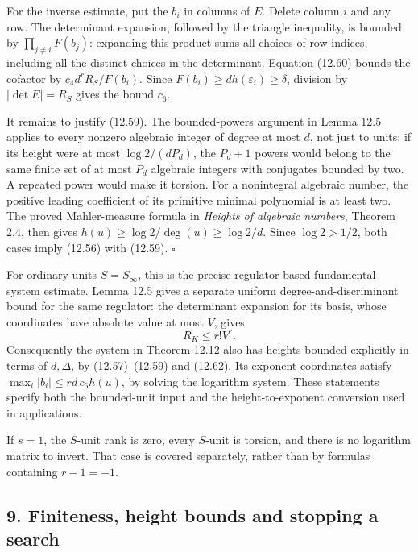 \documentclass[
  11pt,
  a4paper,
]{article}
\begin{document}
For the inverse estimate, put the \(b_i\) in columns of \(E\). Delete
column \(i\) and any row. The determinant expansion, followed by the
triangle inequality, is bounded by \(\prod_{j\ne i}F(b_j)\): expanding
this product sums all choices of row indices, including all the distinct
choices in the determinant. Equation (12.60) bounds the cofactor by
\(c_4d^rR_S/F(b_i)\). Since \(F(b_i)\ge d h(\varepsilon_i)\ge\delta\),
division by \(|\det E|=R_S\) gives the bound \(c_6\).

It remains to justify (12.59). The bounded-powers argument in Lemma 12.5
applies to every nonzero algebraic integer of degree at most \(d\), not
just to units: if its height were at most \(\log2/(dP_d)\), the
\(P_d+1\) powers would belong to the same finite set of at most \(P_d\)
algebraic integers with conjugates bounded by two. A repeated power
would make it torsion. For a nonintegral algebraic number, the positive
leading coefficient of its primitive minimal polynomial is at least two.
The proved Mahler-measure formula in \emph{Heights of algebraic
numbers}, Theorem 2.4, then gives \(h(u)\ge\log2/\deg(u)\ge\log2/d\).
Since \(\log2>1/2\), both cases imply (12.56) with (12.59). \(\square\)

For ordinary units \(S=S_\infty\), this is the precise regulator-based
fundamental-system estimate. Lemma 12.5 gives a separate uniform
degree-and-discriminant bound for the same regulator: the determinant
expansion for its basis, whose coordinates have absolute value at most
\(V\), gives \[
R_K\le r!V^r.
\tag{12.62}
\] Consequently the system in Theorem 12.12 also has heights bounded
explicitly in terms of \(d,\Delta\), by (12.57)--(12.59) and (12.62).
Its exponent coordinates satisfy \(\max_i|b_i|\le rd\,c_6h(u)\), by
solving the logarithm system. These statements specify both the
bounded-unit input and the height-to-exponent conversion used in
applications.

If \(s=1\), the \(S\)-unit rank is zero, every \(S\)-unit is torsion,
and there is no logarithm matrix to invert. That case is covered
separately, rather than by formulas containing \(r-1=-1\).

\subsection{9. Finiteness, height bounds and stopping a
search}\label{finiteness-height-bounds-and-stopping-a-search}
\end{document}
